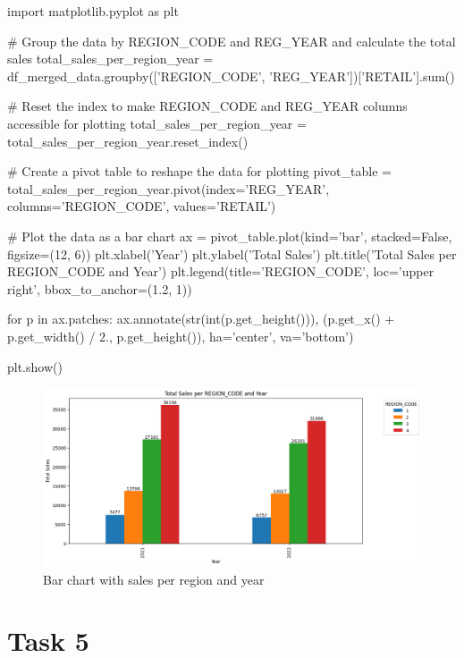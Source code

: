 \documentclass[a4paper, 12pt]{article}
\begin{document}
\begin{python}
	import matplotlib.pyplot as plt
	
	# Group the data by REGION_CODE and REG_YEAR and calculate the total sales
	total_sales_per_region_year = df_merged_data.groupby(['REGION_CODE', 'REG_YEAR'])['RETAIL'].sum()
	
	# Reset the index to make REGION_CODE and REG_YEAR columns accessible for plotting
	total_sales_per_region_year = total_sales_per_region_year.reset_index()
	
	# Create a pivot table to reshape the data for plotting
	pivot_table = total_sales_per_region_year.pivot(index='REG_YEAR', columns='REGION_CODE', values='RETAIL')
	
	# Plot the data as a bar chart
	ax = pivot_table.plot(kind='bar', stacked=False, figsize=(12, 6))
	plt.xlabel('Year')
	plt.ylabel('Total Sales')
	plt.title('Total Sales per REGION_CODE and Year')
	plt.legend(title='REGION_CODE', loc='upper right', bbox_to_anchor=(1.2, 1))
	
	for p in ax.patches:
	ax.annotate(str(int(p.get_height())), (p.get_x() + p.get_width() / 2., p.get_height()), ha='center', va='bottom')
	
	plt.show()
\end{python}

\begin{figure}[!htb]
	\caption{\label{img_8} Bar chart with sales per region and year}
	\begin{center}
		\includegraphics[scale=0.5]{img_08.PNG}
	\end{center}
\end{figure}



\newpage
\section{Task 5}
\end{document}
